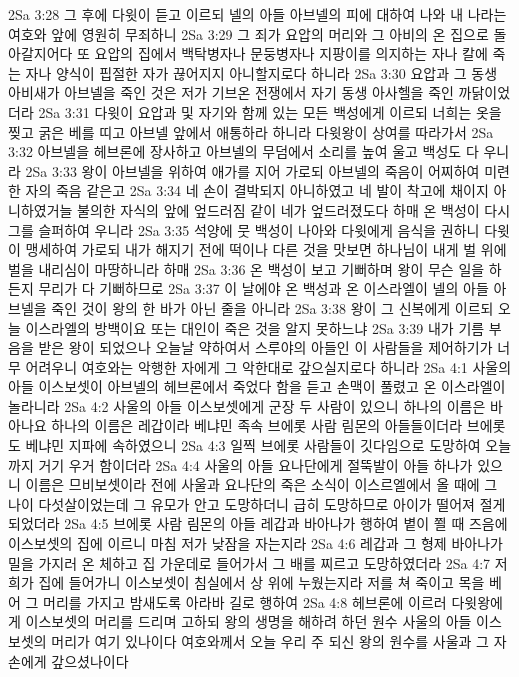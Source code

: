 2Sa 3:28  그 후에 다윗이 듣고 이르되 넬의 아들 아브넬의 피에 대하여 나와 내 나라는 여호와 앞에 영원히 무죄하니
2Sa 3:29  그 죄가 요압의 머리와 그 아비의 온 집으로 돌아갈지어다 또 요압의 집에서 백탁병자나 문둥병자나 지팡이를 의지하는 자나 칼에 죽는 자나 양식이 핍절한 자가 끊어지지 아니할지로다 하니라
2Sa 3:30  요압과 그 동생 아비새가 아브넬을 죽인 것은 저가 기브온 전쟁에서 자기 동생 아사헬을 죽인 까닭이었더라
2Sa 3:31  다윗이 요압과 및 자기와 함께 있는 모든 백성에게 이르되 너희는 옷을 찢고 굵은 베를 띠고 아브넬 앞에서 애통하라 하니라 다윗왕이 상여를 따라가서
2Sa 3:32  아브넬을 헤브론에 장사하고 아브넬의 무덤에서 소리를 높여 울고 백성도 다 우니라
2Sa 3:33  왕이 아브넬을 위하여 애가를 지어 가로되 아브넬의 죽음이 어찌하여 미련한 자의 죽음 같은고
2Sa 3:34  네 손이 결박되지 아니하였고 네 발이 착고에 채이지 아니하였거늘 불의한 자식의 앞에 엎드러짐 같이 네가 엎드러졌도다 하매 온 백성이 다시 그를 슬퍼하여 우니라
2Sa 3:35  석양에 뭇 백성이 나아와 다윗에게 음식을 권하니 다윗이 맹세하여 가로되 내가 해지기 전에 떡이나 다른 것을 맛보면 하나님이 내게 벌 위에 벌을 내리심이 마땅하니라 하매
2Sa 3:36  온 백성이 보고 기뻐하며 왕이 무슨 일을 하든지 무리가 다 기뻐하므로
2Sa 3:37  이 날에야 온 백성과 온 이스라엘이 넬의 아들 아브넬을 죽인 것이 왕의 한 바가 아닌 줄을 아니라
2Sa 3:38  왕이 그 신복에게 이르되 오늘 이스라엘의 방백이요 또는 대인이 죽은 것을 알지 못하느냐
2Sa 3:39  내가 기름 부음을 받은 왕이 되었으나 오늘날 약하여서 스루야의 아들인 이 사람들을 제어하기가 너무 어려우니 여호와는 악행한 자에게 그 악한대로 갚으실지로다 하니라
2Sa 4:1  사울의 아들 이스보셋이 아브넬의 헤브론에서 죽었다 함을 듣고 손맥이 풀렸고 온 이스라엘이 놀라니라
2Sa 4:2  사울의 아들 이스보셋에게 군장 두 사람이 있으니 하나의 이름은 바아나요 하나의 이름은 레갑이라 베냐민 족속 브에롯 사람 림몬의 아들들이더라 브에롯도 베냐민 지파에 속하였으니
2Sa 4:3  일찍 브에롯 사람들이 깃다임으로 도망하여 오늘까지 거기 우거 함이더라
2Sa 4:4  사울의 아들 요나단에게 절뚝발이 아들 하나가 있으니 이름은 므비보셋이라 전에 사울과 요나단의 죽은 소식이 이스르엘에서 올 때에 그 나이 다섯살이었는데 그 유모가 안고 도망하더니 급히 도망하므로 아이가 떨어져 절게 되었더라
2Sa 4:5  브에롯 사람 림몬의 아들 레갑과 바아나가 행하여 볕이 쬘 때 즈음에 이스보셋의 집에 이르니 마침 저가 낮잠을 자는지라
2Sa 4:6  레갑과 그 형제 바아나가 밀을 가지러 온 체하고 집 가운데로 들어가서 그 배를 찌르고 도망하였더라
2Sa 4:7  저희가 집에 들어가니 이스보셋이 침실에서 상 위에 누웠는지라 저를 쳐 죽이고 목을 베어 그 머리를 가지고 밤새도록 아라바 길로 행하여
2Sa 4:8  헤브론에 이르러 다윗왕에게 이스보셋의 머리를 드리며 고하되 왕의 생명을 해하려 하던 원수 사울의 아들 이스보셋의 머리가 여기 있나이다 여호와께서 오늘 우리 주 되신 왕의 원수를 사울과 그 자손에게 갚으셨나이다
